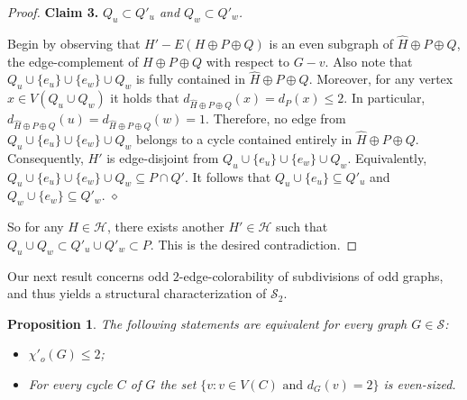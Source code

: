 \documentclass[a4paper,12pt]{article}
\newtheorem{proposition}[theorem]{Proposition}
\numberwithin{equation}{section}
\begin{document}
\begin{proof}
\bigskip

\noindent \textbf{Claim 3.} \textit{$Q_u\subset Q'_u$ and $Q_w\subset Q'_w$.}

\medskip

\noindent Begin by observing that $H'-E(H\oplus P\oplus Q)$ is an even subgraph of $\hat{H}\oplus P\oplus Q$, the edge-complement of $H\oplus P\oplus Q$ with respect to $G-v$. Also note that $Q_u\cup\{e_u\}\cup \{e_w\}\cup Q_w$ is  fully contained in $\hat{H}\oplus P\oplus Q$. Moreover, for any vertex $x\in V(Q_u\cup Q_w)$ it holds that $d_{\hat{H}\oplus P\oplus Q}(x)=d_P(x)\leq2$. In particular, $d_{\hat{H}\oplus P\oplus Q}(u)=d_{\hat{H}\oplus P\oplus Q}(w)=1$. Therefore, no edge from $Q_u\cup\{e_u\}\cup \{e_w\}\cup Q_w$ belongs to a cycle contained entirely in $\hat{H}\oplus P\oplus Q$. Consequently, $H'$ is edge-disjoint from $Q_u\cup\{e_u\}\cup \{e_w\}\cup Q_w$. Equivalently, $Q_u\cup\{e_u\}\cup \{e_w\}\cup Q_w\subseteq P\cap Q'$. It follows that $Q_u\cup\{e_u\}\subseteq Q'_u$ and $Q_w\cup\{e_w\}\subseteq Q'_w$. \hfill$\diamond$

\bigskip

So for any $H\in\mathcal{H}$, there exists another $H'\in\mathcal{H}$ such that $Q_u\cup Q_w\subset Q'_u\cup Q'_w \subset P$.
This is the desired contradiction.
\end{proof}



Our next result concerns odd $2$-edge-colorability of subdivisions of odd graphs, and thus yields a structural characterization of $\mathcal{S}_2$.

\begin{proposition} The following statements are equivalent for every graph $G\in \mathcal{S}$:
\begin{itemize}
\item[$(i)$] $\chi'_o(G)\leq2$;
\item[$(ii)$] For every cycle $C$ of $G$ the set $\{v:v\in V(C) \text{ and } d_G(v)=2\}$ is even-sized.
\end{itemize}
\end{proposition}
\end{document}
